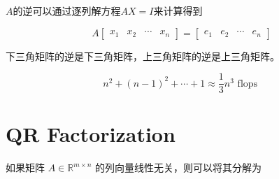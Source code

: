 \begin{theorem}[高斯消元法]
    $A$的逆可以通过逐列解方程$AX=I$来计算得到

    \begin{equation} A\left[\begin{array}{llll}x_{1} & x_{2} & \cdots & x_{n}\end{array}\right]=\left[\begin{array}{llll}e_{1} & e_{2} & \cdots & e_{n}\end{array}\right] \end{equation}
\end{theorem}

\begin{theorem}
    下三角矩阵的逆是下三角矩阵，上三角矩阵的逆是上三角矩阵。
\end{theorem}

\begin{theorem}
    \label{complexity:inverse-of-triangular}

\begin{equation} n^{2}+(n-1)^{2}+\cdots+1 \approx \frac{1}{3} n^{3}\text{ flops }\end{equation} 
\end{theorem}



\section{QR Factorization}



如果矩阵 $ A \in \mathbb{R}^{m \times n} $ 的列向量线性无关，则可以将其分解为

